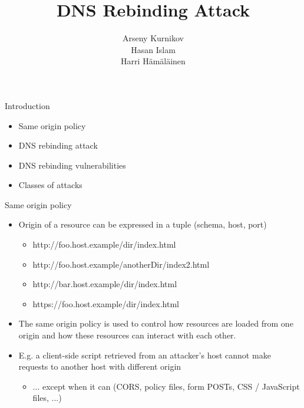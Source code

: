\documentclass{beamer}
\title{DNS Rebinding Attack}
\author{Arseny Kurnikov\\
Hasan Islam\\
Harri Hämäläinen}
\begin{document}
\begin{frame}
\titlepage
\end{frame}

\begin{frame}{Introduction}
    \begin{itemize}
        \item Same origin policy
        \item DNS rebinding attack
        \item DNS rebinding vulnerabilities
        \item Classes of attacks
    \end{itemize}
\end{frame}

\begin{frame}{Same origin policy}
    \begin{itemize}
        \item Origin of a resource can be expressed in a tuple (schema, host, port)
            \begin{itemize}
                \item http://foo.host.example/dir/index.html
                \item http://foo.host.example/anotherDir/index2.html
                \item http://bar.host.example/dir/index.html
                \item https://foo.host.example/dir/index.html
            \end{itemize}
        \item The same origin policy is used to control how resources are loaded
        from one origin and how these resources can interact with each other.
        \item E.g. a client-side script retrieved from an attacker's host
        cannot make requests to another host with different origin
        \begin{itemize}
            \item ... except when it can (CORS, policy files, form POSTs, CSS /
            JavaScript files, ...)
        \end{itemize}
    \end{itemize}
\end{frame}
\end{document}
